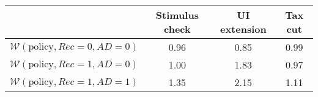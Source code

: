\begin{tabular}{@{}lccc@{}} 
\toprule 
                          & Stimulus check      & UI extension    & Tax cut    \\  \midrule 
$\mathcal{W}(\text{policy}, Rec=0, AD=0)$ & 0.96  & 0.85  & 0.99     \\ 
$\mathcal{W}(\text{policy}, Rec=1, AD=0)$ & 1.00  & 1.83  & 0.97     \\ 
$\mathcal{W}(\text{policy}, Rec=1, AD=1)$ & 1.35  & 2.15  & 1.11     \\ \bottomrule 
\end{tabular}  
